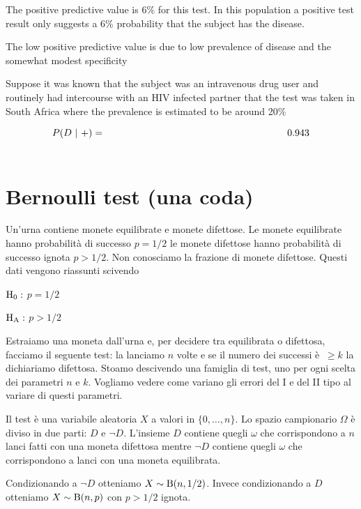 \documentclass[10pt,openany]{book}
\def\H0{{\rm H_0}}
\def\HA{{\rm H_A}}
\theoremstyle{mio}
\theoremstyle{liscio}
\begin{document}
The {\color{brown}positive predictive value is 6\%} for this test. In this population a positive test result only suggests a 6\% probability that the subject has the disease. 


The low positive predictive value is due to low prevalence of disease and the
somewhat modest specificity 

Suppose it was known that the subject was an intravenous drug user and routinely had intercourse with an HIV infected partner that the test was taken in South Africa where the prevalence is estimated to be around 20\%

\begin{eqnarray*}
P(D ~|~ +)& = & 0.943\\
& \hphantom{=} & \hphantom{\frac{P(T_+|D)P(D)}{P(T_+|D)P(D) + \big[1-P(T_-|\neg D)\big]\ \big[1 - P(D)\big]\vphantom{\Big[}}}
\end{eqnarray*}



\clearpage\section{Bernoulli test (una coda)}\label{Bernoulli_test}

Un'urna contiene monete equilibrate e monete difettose. Le monete equilibrate hanno probabilità di successo $p=1/2$ le monete difettose hanno probabilità di successo ignota $p>1/2$. Non conosciamo la frazione di monete difettose. Questi dati vengono riassunti scivendo

$\H0:$ $p=1/2$

$\HA:$ $p>1/2$
 
Estraiamo una moneta dall'urna e, per decidere tra equilibrata o difettosa, facciamo il seguente test: la lanciamo $n$ volte e se il numero dei successi è $\ \ge k$ la dichiariamo difettosa. Stoamo descivendo una famiglia di test, uno per ogni scelta dei parametri $n$ e $k$. Vogliamo vedere come variano gli errori del I e del II tipo al variare di questi parametri. 

Il test è una variabile aleatoria $X$ a valori in $\{0,\dots,n\}$. Lo spazio campionario $\Omega$ è diviso in due parti: $D$ e $\neg D$.  L'insieme $D$ contiene quegli $\omega$ che corrispondono a $n$ lanci fatti con una moneta difettosa mentre $\neg D$ contiene quegli $\omega$ che corrispondono a lanci con una moneta equilibrata. 

Condizionando a $\neg D$ otteniamo $X\sim {\rm B}(n,1/2)$. Invece condizionando a $D$ otteniamo $X\sim {\rm B}(n,p)$ con $p>1/2$ ignota.
\end{document}
